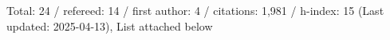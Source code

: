 Total: 24 / refereed: 14 / first author: 4 / citations: 1,981 / h-index: 15 (Last updated: 2025-04-13), List attached below